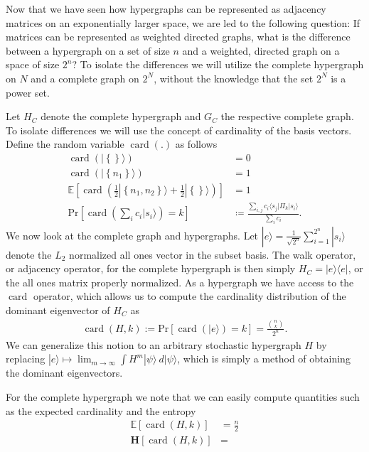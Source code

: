 \documentclass{article}
\newcommand{\ket}[1]{|#1\rangle}
\newcommand{\bra}[1]{\langle #1|}
\newcommand{\ketbra}[2]{| #1\rangle\! \langle #2|}
\newcommand{\parens}[1]{\left( #1 \right)}
\newcommand{\brackets}[1]{\left[ #1 \right]}
\newcommand{\set}[1]{\left\{ #1 \right\}}
\newcommand{\expect}[1]{\mathbb{E}\brackets{#1}}
\newcommand{\prob}[1]{\text{Pr}\left[ #1 \right]}
\DeclareMathOperator{\card}{card}
\newcommand{\cardi}[1]{\card \parens{ #1 }}
\begin{document}
Now that we have seen how hypergraphs can be represented as adjacency matrices on an exponentially larger space, we are led to the following question: If matrices can be represented as weighted directed graphs, what is the difference between a hypergraph on a set of size $n$ and a weighted, directed graph on a space of size $2^n$? To isolate the differences we will utilize the complete hypergraph on $N$ and a complete graph on $2^N$, without the knowledge that the set $2^N$ is a power set. 

Let $H_C$ denote the complete hypergraph and $G_C$ the respective complete graph. To isolate differences we will use the concept of cardinality of the basis vectors. Define the random variable $\card(.)$ as follows
\begin{align}
    \card(\ket{\set{}}) &= 0 \\
    \card(\ket{\set{n_1}}) &= 1 \\
    \expect{\cardi{\frac{1}{2} \ket{\set{n_1, n_2}} + \frac{1}{2} \ket{\set{}} }} &= 1 \\
    \prob{\cardi{\sum_{i} c_i \ket{s_i}} = k } & \coloneqq \frac{\sum_{i,j} c_i \bra{s_j} \Pi_k \ket{s_i}}{ \sum_i c_i}.
\end{align}
We now look at the complete graph and hypergraphs. Let $\ket{e} = \frac{1}{\sqrt{2^n}} \sum_{i=1}^{2^n} \ket{s_i}$ denote the $L_2$ normalized all ones vector in the subset basis. The walk operator, or adjacency operator, for the complete hypergraph is then simply $H_C = \ketbra{e}{e}$, or the all ones matrix properly normalized. As a hypergraph we have access to the $\card$ operator, which allows us to compute the cardinality distribution of the dominant eigenvector of $H_C$ as
\begin{align}
    \cardi{H, k} := \prob{\cardi{\ket{e}} = k } = \frac{\binom{n}{k}}{2^n}.
\end{align}
We can generalize this notion to an arbitrary stochastic hypergraph $H$  by replacing $\ket{e} \mapsto \lim_{m \to \infty} \int H^m \ket{\psi} ~d\ket{\psi} $, which is simply a method of obtaining the dominant eigenvectors.

For the complete hypergraph we note that we can easily compute quantities such as the expected cardinality and the entropy
\begin{align}
    \expect{\cardi{H, k}} &= \frac{n}{2} \\
    \mathbf{H} \brackets{\cardi{H, k}} &= \\
\end{align}
\end{document}
